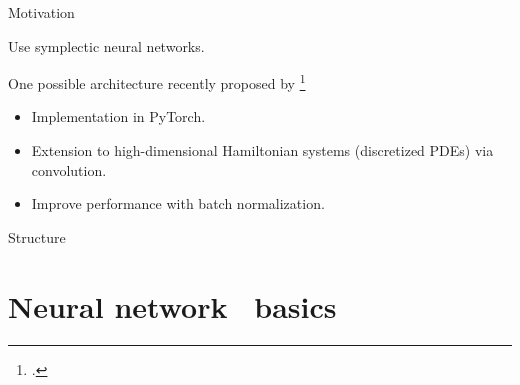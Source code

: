 \begin{frame}[c]{Motivation}
  \begin{center}

    \vspace{0.3cm}
     Use symplectic neural networks.
  \end{center}

  \vspace{0.3cm}
  One possible architecture recently proposed by \citeauthor{Jin2020}\footcite{Jin2020}
  \begin{itemize}
    \item Implementation in PyTorch.
    \item Extension to high-dimensional Hamiltonian systems 
    (discretized PDEs) via convolution.
    \item Improve performance with batch normalization.
  \end{itemize}
\end{frame}

\begin{frame}{Structure}
  \tableofcontents
\end{frame}

\section{Neural network ~\newline basics}

